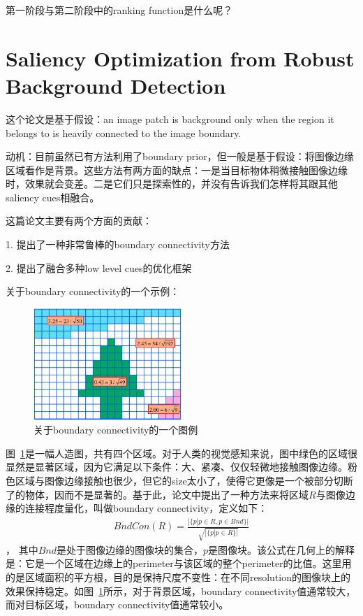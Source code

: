 \documentclass[12pt]{article}
\begin{document}
第一阶段与第二阶段中的ranking function是什么呢？

\section{Saliency Optimization from Robust Background Detection}

这个论文是基于假设：an image patch is background only when the region it belongs to is heavily connected to the image boundary.

动机：目前虽然已有方法利用了boundary prior，但一般是基于假设：将图像边缘区域看作是背景。这些方法有两方面的缺点：一是当目标物体稍微接触图像边缘时，效果就会变差。二是它们只是探索性的，并没有告诉我们怎样将其跟其他saliency cues相融合。

这篇论文主要有两个方面的贡献：

1. 提出了一种非常鲁棒的boundary connectivity方法

2. 提出了融合多种low level cues的优化框架

关于boundary connectivity的一个示例：
\begin{figure}[!ht]
\centering
\includegraphics[width=0.5\textwidth]{wCtr.png}
\caption{关于boundary connectivity的一个图例}
\label{fig: wCtr}
\end{figure}

图~\ref{fig: wCtr}是一幅人造图，共有四个区域。对于人类的视觉感知来说，图中绿色的区域很显然是显著区域，因为它满足以下条件：大、紧凑、仅仅轻微地接触图像边缘。粉色区域与图像边缘接触也很少，但它的size太小了，使得它更像是一个被部分切断了的物体，因而不是显著的。基于此，论文中提出了一种方法来将区域$R$与图像边缘的连接程度量化，叫做boundary connectivity，定义如下：
\begin{align}
BndCon(R) = \frac{|\{p|p \in R, p \in Bnd\}|}{\sqrt{|\{p|p \in R\}|}}
\end{align}，
其中$Bnd$是处于图像边缘的图像块的集合，$p$是图像块。该公式在几何上的解释是：它是一个区域在边缘上的perimeter与该区域的整个perimeter的比值。这里用的是区域面积的平方根，目的是保持尺度不变性：在不同resolution的图像块上的效果保持稳定。如图~\ref{fig: wCtr}所示，对于背景区域，boundary connectivity值通常较大，而对目标区域，boundary connectivity值通常较小。
\end{document}
